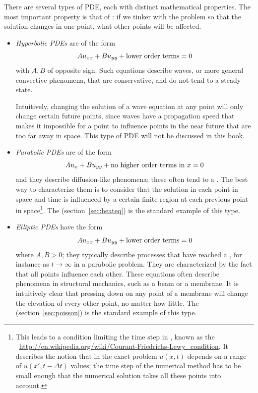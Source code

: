 There are several types of \ac{PDE}, each with distinct mathematical
properties. The most important property is that of : if we tinker with the problem so that the solution
changes in one point, what other points will be affected.
\begin{itemize}
\item \emph{Hyperbolic \acp{PDE}} are of the form
\[ Au_{xx}+Bu_{yy}+\hbox{lower order terms} =0 \]
with $A,B$ of opposite sign. Such equations describe waves,
or more general convective phenomena, that are conservative,
and do not tend to a steady state.

Intuitively, changing the solution of a wave equation at any point
will only change certain future points, since waves have a propagation
speed that makes it impossible for a point to influence points in the
near future that are too far away in space. This type of \ac{PDE} will
not be discussed in this book.
\item \emph{Parabolic \acp{PDE}} are of the form
\[ Au_x+Bu_{yy}+\hbox{no higher order terms in $x$}=0 \]
and they describe diffusion-like phenomena; these often tend to a
. The best way to
characterize them is to consider that the solution in each point in
space and time is influenced by a certain finite region at each
previous point in space\footnote{This leads to a condition limiting
  the time step in , known as the
  ~\url{http://en.wikipedia.org/wiki/Courant-Friedrichs-Lewy_condition}.
  It describes the notion that in the exact problem $u(x,t)$ depends
  on a range of $u(x',t-\Delta t)$ values; the time step of the
  numerical method has to be small enough that the numerical solution
  takes all these points into account.}. The 
(section~\ref{sec:heateq}) is the standard example of this type.
\item \emph{Elliptic \acp{PDE}} have the form 
\[ Au_{xx}+Bu_{yy}+\hbox{lower order terms} =0 \]
where $A,B>0$; they typically describe processes that have reached a
, for instance as $t\rightarrow\infty$ in a parabolic
problem. They are characterized by the fact that all points influence
each other. These equations often describe phenomena in structural
mechanics, such as a beam or a membrane. It is intuitively clear that
pressing down on any point of a membrane will change the elevation of
every other point, no matter how little. The  (section~\ref{sec:poisson}) is the standard example of
this type.
\end{itemize}

